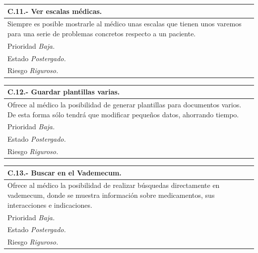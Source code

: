 \documentclass[a4paper,oneside,11pt]{book}
\begin{document}
\begin{center}
\begin{tabulary}{15cm}{|L|}
	\hline
		\bf{C.11.- Ver escalas médicas.} \\
	\hline
		Siempre es posible mostrarle al médico unas escalas que tienen unos varemos para una serie de problemas concretos respecto a un paciente. \\
	\hline
		Prioridad \textit{Baja.} \\
	\hline
		Estado \textit{Postergado.} \\
	\hline
		Riesgo \textit{Riguroso.} \\
	\hline
\end{tabulary}
\end{center}

\begin{center}
\begin{tabulary}{15cm}{|L|}
	\hline
		\bf{C.12.- Guardar plantillas varias.} \\
	\hline
		Ofrece al médico la posibilidad de generar plantillas para documentos varios. De esta forma sólo tendrá que modificar pequeños datos, ahorrando tiempo. \\
	\hline
		Prioridad \textit{Baja.} \\
	\hline
		Estado \textit{Postergado.} \\
	\hline
		Riesgo \textit{Riguroso.} \\
	\hline
\end{tabulary}
\end{center}

\begin{center}
\begin{tabulary}{15cm}{|L|}
	\hline
		\bf{C.13.- Buscar en el Vademecum.} \\
	\hline
		Ofrece al médico la posibilidad de realizar búsquedas directamente en vademecum, donde se muestra información sobre medicamentos, sus interacciones e indicaciones. \\
	\hline
		Prioridad \textit{Baja.} \\
	\hline
		Estado \textit{Postergado.} \\
	\hline
		Riesgo \textit{Riguroso.} \\
	\hline
\end{tabulary}
\end{center}
\end{document}
